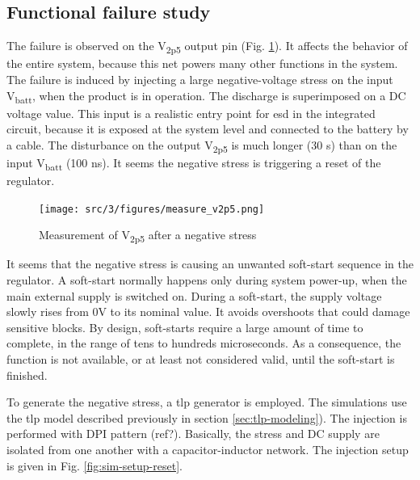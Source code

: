 \subsection{Functional failure study}
\label{sec:failure-case-study}


The failure is observed on the V\textsubscript{2p5} output pin (Fig. \ref{fig:meas-reset-v2p5}).
It affects the behavior of the entire system, because this net powers many other functions in the system.
The failure is induced by injecting a large negative-voltage stress on the input V\textsubscript{batt}, when the product is in operation.
The discharge is superimposed on a DC voltage value.
This input is a realistic entry point for \gls{esd} in the integrated circuit, because it is exposed at the system level and connected to the battery by a cable.
The disturbance on the output V\textsubscript{2p5} is much longer (30 \textmu{}s) than on the input V\textsubscript{batt} (100 ns).
It seems the negative stress is triggering a reset of the regulator.

\begin{figure}[!h]
  \centering
  \texttt{[image: src/3/figures/measure\_v2p5.png]}
  \caption{Measurement of V\textsubscript{2p5} after a negative stress}
  \label{fig:meas-reset-v2p5}
\end{figure}

It seems that the negative stress is causing an unwanted \gls{soft-start} sequence in the regulator.
A soft-start normally happens only during system power-up, when the main external supply is switched on.
During a soft-start, the supply voltage slowly rises from 0V to its nominal value.
It avoids overshoots that could damage sensitive blocks.
By design, soft-starts require a large amount of time to complete, in the range of tens to hundreds microseconds.
As a consequence, the function is not available, or at least not considered valid, until the soft-start is finished.

To generate the negative stress, a \gls{tlp} generator is employed.
The simulations use the \gls{tlp} model described previously in section \ref{sec:tlp-modeling}).
The injection is performed with DPI pattern (ref?).
Basically, the stress and DC supply are isolated from one another with a capacitor-inductor network.
The injection setup is given in Fig. \ref{fig:sim-setup-reset}.

